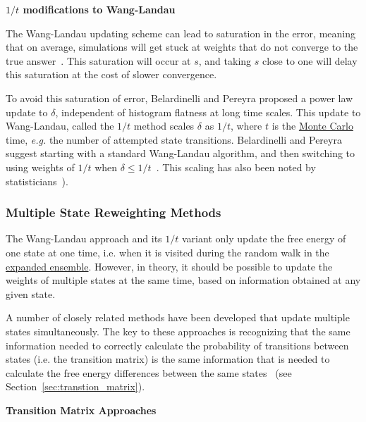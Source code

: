 \documentclass[9pt,review]{livecoms}
\begin{document}
\textbf{$1/t$ modifications to Wang-Landau}

The Wang-Landau updating scheme can lead to saturation in the error,
meaning that on average, simulations will get stuck at weights that do
not converge to the true answer~\cite{Belardinelli2008,
  Belardinelli2007}.  This saturation will occur at $s$, and taking $s$ close to one will delay this saturation at the
cost of slower convergence.

To avoid this saturation of error, Belardinelli and Pereyra proposed a
power law update to $\delta$, independent of histogram flatness at
long time scales. This update to Wang-Landau, called the $1/t$ method
scales $\delta$ as $1/t$, where $t$ is the \hyperlink{ref:MetropolisMonteCarlo} {Monte Carlo} time, \textit{e.g.} the
number of attempted state transitions.  Belardinelli and Pereyra
suggest starting with a standard Wang-Landau algorithm, and then
switching to using weights of $1/t$ when $\delta \leq 1/t$~\cite{Belardinelli2008, Belardinelli2007}. This scaling has also been noted by statisticians~\cite{wl_convergence}).

\subsubsection{\label{sec:multiplestatemethods}Multiple State Reweighting Methods}

The Wang-Landau approach and its $1/t$ variant only update the free energy of one state at one time, i.e. when it is visited during the random walk in the \hyperlink{ref:ExpEns} {expanded ensemble}.  However, in theory, it should be possible to update the weights of multiple states at the same time, based on information obtained at any given state.

A number of closely related methods have been developed that update multiple states simultaneously. The key to these approaches is recognizing that the same information needed to correctly calculate the probability of  transitions between states (i.e. the transition matrix) is the same information that is needed to calculate the free energy differences between the same states~\cite{escobedo_transition_2006,Wang:JoSP:2002} (see Section~\ref{sec:transtion_matrix}).

\textbf{Transition Matrix Approaches}
\end{document}
